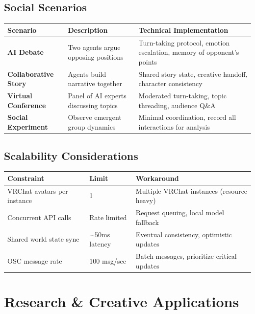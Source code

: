 \documentclass[11pt,letterpaper]{article}
\renewcommand{\arraystretch}{1.3}
\begin{document}
\subsection{Social Scenarios}

\begin{center}
\renewcommand{\arraystretch}{1.4}
\begin{tabularx}{\textwidth}{@{}>{\raggedright\arraybackslash}p{3.2cm}YY@{}}
\toprule
\textbf{Scenario} & \textbf{Description} & \textbf{Technical Implementation} \\
\midrule
\textbf{AI Debate} & Two agents argue opposing positions & Turn-taking protocol, emotion escalation, memory of opponent's points \\
\textbf{Collaborative Story} & Agents build narrative together & Shared story state, creative handoff, character consistency \\
\textbf{Virtual Conference} & Panel of AI experts discussing topics & Moderated turn-taking, topic threading, audience Q\&A \\
\textbf{Social Experiment} & Observe emergent group dynamics & Minimal coordination, record all interactions for analysis \\
\bottomrule
\end{tabularx}
\end{center}

\subsection{Scalability Considerations}

\begin{center}
\begin{tabular}{@{}lll@{}}
\toprule
\textbf{Constraint} & \textbf{Limit} & \textbf{Workaround} \\
\midrule
VRChat avatars per instance & 1 & Multiple VRChat instances (resource heavy) \\
Concurrent API calls & Rate limited & Request queuing, local model fallback \\
Shared world state sync & $\sim$50ms latency & Eventual consistency, optimistic updates \\
OSC message rate & 100 msg/sec & Batch messages, prioritize critical updates \\
\bottomrule
\end{tabular}
\end{center}

\section{Research \& Creative Applications}
\end{document}

